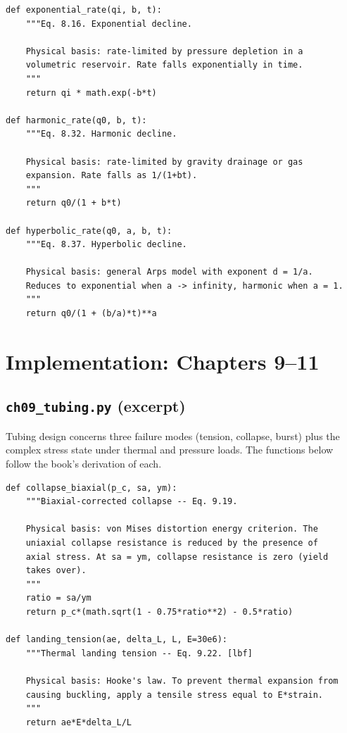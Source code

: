 \documentclass[11pt,a4paper,openany]{book}
\newcommand{\code}[1]{\texttt{#1}}
\begin{document}
\begin{lstlisting}
def exponential_rate(qi, b, t):
    """Eq. 8.16. Exponential decline.

    Physical basis: rate-limited by pressure depletion in a
    volumetric reservoir. Rate falls exponentially in time.
    """
    return qi * math.exp(-b*t)

def harmonic_rate(q0, b, t):
    """Eq. 8.32. Harmonic decline.

    Physical basis: rate-limited by gravity drainage or gas
    expansion. Rate falls as 1/(1+bt).
    """
    return q0/(1 + b*t)

def hyperbolic_rate(q0, a, b, t):
    """Eq. 8.37. Hyperbolic decline.

    Physical basis: general Arps model with exponent d = 1/a.
    Reduces to exponential when a -> infinity, harmonic when a = 1.
    """
    return q0/(1 + (b/a)*t)**a
\end{lstlisting}

\chapter{Implementation: Chapters 9--11}

\section{\code{ch09\_tubing.py} (excerpt)}

\begin{theory}
Tubing design concerns three failure modes (tension, collapse, burst)
plus the complex stress state under thermal and pressure loads.
The functions below follow the book's derivation of each.
\end{theory}

\begin{lstlisting}
def collapse_biaxial(p_c, sa, ym):
    """Biaxial-corrected collapse -- Eq. 9.19.

    Physical basis: von Mises distortion energy criterion. The
    uniaxial collapse resistance is reduced by the presence of
    axial stress. At sa = ym, collapse resistance is zero (yield
    takes over).
    """
    ratio = sa/ym
    return p_c*(math.sqrt(1 - 0.75*ratio**2) - 0.5*ratio)

def landing_tension(ae, delta_L, L, E=30e6):
    """Thermal landing tension -- Eq. 9.22. [lbf]

    Physical basis: Hooke's law. To prevent thermal expansion from
    causing buckling, apply a tensile stress equal to E*strain.
    """
    return ae*E*delta_L/L
\end{lstlisting}
\end{document}
